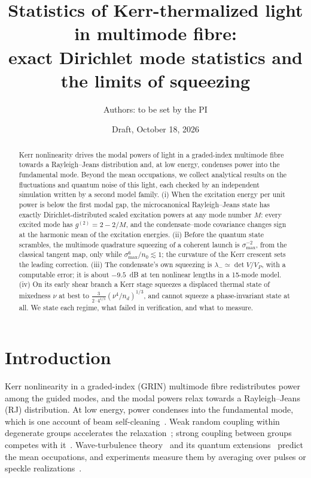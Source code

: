 \documentclass[aps,pra,twocolumn,superscriptaddress,nofootinbib,floatfix]{revtex4-2}
\begin{document}
\title{Statistics of Kerr-thermalized light in multimode fibre:\\
exact Dirichlet mode statistics and the limits of squeezing}

\author{Authors: to be set by the PI}
\noaffiliation

\date{Draft, October 18, 2026}

\begin{abstract}
Kerr nonlinearity drives the modal powers of light in a graded-index multimode fibre towards a Rayleigh--Jeans
distribution and, at low energy, condenses power into the fundamental mode. Beyond the mean occupations, we collect
analytical results on the fluctuations and quantum noise of this light, each checked by an independent simulation written
by a second model family. (i) When the excitation energy per unit power is
below the first modal gap, the microcanonical Rayleigh--Jeans state has exactly Dirichlet-distributed scaled excitation
powers at any mode number $M$: every excited mode has $g^{(2)}=2-2/M$, and the condensate--mode covariance changes sign
at the harmonic mean of the excitation energies. (ii) Before the quantum state scrambles, the multimode quadrature
squeezing of a coherent launch is $\sigma_{\max}^{-2}$, from the classical tangent map, only while
$\sigma_{\max}^6/n_0\lesssim1$; the curvature of the Kerr crescent sets the leading correction. (iii) The condensate's
own squeezing is $\lambda_-\simeq\det V/V_P$, with a computable error; it is about $-9.5$~dB at ten nonlinear lengths in a
15-mode model. (iv) On its early shear branch a Kerr stage squeezes a displaced thermal state of mixedness $\nu$
at best to $\frac{3}{2\cdot4^{1/3}}(\nu^4/n_d)^{1/3}$, and cannot squeeze a phase-invariant state at all. We state each regime, what failed in verification, and what to measure.
\end{abstract}

\maketitle

\section{Introduction}

Kerr nonlinearity in a graded-index (GRIN) multimode fibre redistributes power among the guided modes, and the modal
powers relax towards a Rayleigh--Jeans (RJ) distribution. At low energy, power condenses into the fundamental mode,
which is one account of beam self-cleaning~\cite{picozzi2014,baudin2020,pourbeyram2022,baudin2023}. Weak random coupling within degenerate groups accelerates the
relaxation~\cite{fusaro2019,garnier2019}; strong coupling between groups competes with it~\cite{berti2022}. Wave-turbulence theory~\cite{picozzi2014,connaughton2005,aschieri2011}
and its quantum extensions~\cite{chiocchetta2016,zanaglia2025} predict the mean occupations, and experiments measure
them by averaging over pulses or speckle realizations~\cite{pourbeyram2022,baudin2020,baudin2023}.
\end{document}
